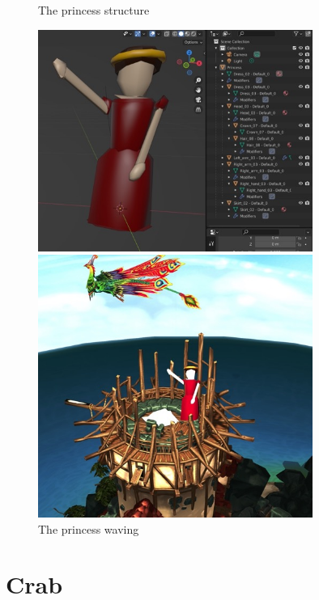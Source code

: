 \documentclass[10pt,a4paper]{article}
\begin{document}
\begin{figure}[H]
\centering
\caption{The princess structure}
\includegraphics[width=0.8\textwidth]{princess}
\caption{The princess waving}
\includegraphics[width=0.8\textwidth]{princess_hello}
\end{figure}


\section{Crab}
\end{document}
